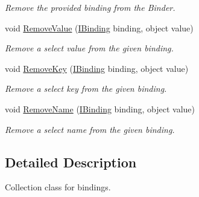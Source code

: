 \begin{DoxyCompactItemize}
\begin{DoxyCompactList}\small\item\em Remove the provided binding from the Binder. \end{DoxyCompactList}\item 
\hypertarget{interfacestrange_1_1framework_1_1api_1_1_i_binder_a390954ea1445824dccd05f5785da605d}{void \hyperlink{interfacestrange_1_1framework_1_1api_1_1_i_binder_a390954ea1445824dccd05f5785da605d}{Remove\-Value} (\hyperlink{interfacestrange_1_1framework_1_1api_1_1_i_binding}{I\-Binding} binding, object value)}\label{interfacestrange_1_1framework_1_1api_1_1_i_binder_a390954ea1445824dccd05f5785da605d}

\begin{DoxyCompactList}\small\item\em Remove a select value from the given binding. \end{DoxyCompactList}\item 
\hypertarget{interfacestrange_1_1framework_1_1api_1_1_i_binder_aa0389b8eb87da4dd5d0f16f8e5ef9736}{void \hyperlink{interfacestrange_1_1framework_1_1api_1_1_i_binder_aa0389b8eb87da4dd5d0f16f8e5ef9736}{Remove\-Key} (\hyperlink{interfacestrange_1_1framework_1_1api_1_1_i_binding}{I\-Binding} binding, object value)}\label{interfacestrange_1_1framework_1_1api_1_1_i_binder_aa0389b8eb87da4dd5d0f16f8e5ef9736}

\begin{DoxyCompactList}\small\item\em Remove a select key from the given binding. \end{DoxyCompactList}\item 
\hypertarget{interfacestrange_1_1framework_1_1api_1_1_i_binder_a1d683db48676ef933f3bd4ad53da40ed}{void \hyperlink{interfacestrange_1_1framework_1_1api_1_1_i_binder_a1d683db48676ef933f3bd4ad53da40ed}{Remove\-Name} (\hyperlink{interfacestrange_1_1framework_1_1api_1_1_i_binding}{I\-Binding} binding, object value)}\label{interfacestrange_1_1framework_1_1api_1_1_i_binder_a1d683db48676ef933f3bd4ad53da40ed}

\begin{DoxyCompactList}\small\item\em Remove a select name from the given binding. \end{DoxyCompactList}\end{DoxyCompactItemize}


\subsection{Detailed Description}
Collection class for bindings. 

